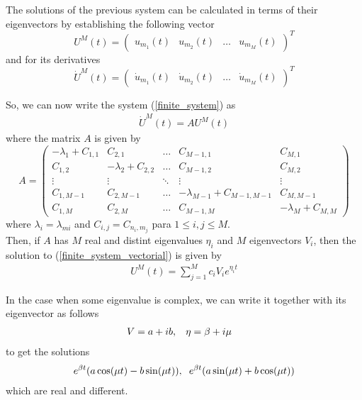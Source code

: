 	The solutions of the previous system can be calculated in terms of their eigenvectors by establishing the following vector
	\begin{equation*}
		U^M (t) =
		\begin{pmatrix}
			u_{m_1} (t) & u_{m_2} (t) & \dots & u_{m_M} (t)
		\end{pmatrix}^T   
	\end{equation*}
	and for its derivatives
	\begin{equation*}
		\dot{U}^M (t) =
		\begin{pmatrix}
			\dot{u}_{m_1} (t) & \dot{u}_{m_2} (t) & \dots & \dot{u}_{m_M} (t)
		\end{pmatrix}^T   
	\end{equation*}
	
	So, we can now write the system (\ref{finite_system}) as 
	\begin{align}
		\label{finite_system_vectorial}
		\dot{U}^M (t) = A U^M (t)
	\end{align}
	where the matrix $A$ is given by
	\begin{equation*}
		A =
		\begin{pmatrix}
			-\lambda_1 + C_{1,1} & C_{2,1} & \dots & C_{M-1,1} & C_{M,1} 
			\\
			C_{1,2} & -\lambda_2 + C_{2,2} & \dots & C_{M-1,2} & C_{M,2}  
			\\
			\vdots & \vdots & \ddots & \vdots & \vdots
			\\
			C_{1,M-1} & C_{2,M-1} & \dots & -\lambda_{M-1} + C_{M-1,M-1} & C_{M,M-1} 
			\\
			C_{1,M} & C_{2,M} & \dots & C_{M-1,M} & -\lambda_{M} + C_{M,M} 
		\end{pmatrix}
	\end{equation*}
	where $\lambda_i = \lambda_{mi}$ and $C_{i, j} = C_{n_i, m_j}$ para $1 \leq i, j \leq M$. \\
	
	\noindent Then, if $A$ has $M$ real and distint eigenvalues $\eta_i$ and $M$ eigenvectors $V_i$, then the solution to (\ref{finite_system_vectorial}) is given by
	\begin{align}
		\label{solution_finite_system}
		U^M (t) = \displaystyle \sum _{j = 1}^{M} c_i V_i e^{\eta_i t}
	\end{align}

	In the case when some eigenvalue is complex, we can write it together with its eigenvector as follows
	\begin{align*}
		V &= a + i b, \hspace{3mm} \eta = \beta + i \mu
	\end{align*}
	to get the solutions
	\begin{align*}
		e^{\beta t} (a \cos(\mu t) - b \sin(\mu t)), \hspace{2mm} e^{\beta t} (a \sin(\mu t) + b \cos(\mu t))
	\end{align*}
	which are real and different. \\
	
